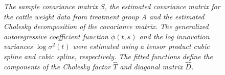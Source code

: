 \begin{figure}[ht]
 \caption{\textit{The sample covariance matrix $S$, the estimated covariance matrix for the cattle weight data from treatment group A and the estimated Cholesky decomposition of the covariance matrix. The generalized autoregressive coefficient function $\phi\left(t,s\right)$ and the log innovation variances $\log \sigma^2\left(t\right)$ were estimated using a tensor product cubic spline and cubic spline, respectively. The fitted functions define the components of the Cholesky factor $\hat{T}$ and diagonal matrix $\hat{D}$.}}  \label{fig:fitted-cholesky-decomposition-cattle-date}
\end{figure}


